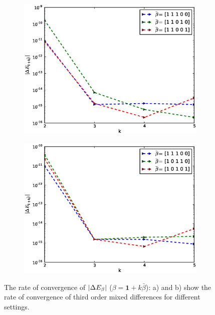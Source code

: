 \documentclass[11pt]{article}
\begin{document}
	\begin{figure}
	\centering
	\begin{subfigure}{.5\textwidth}
		\centering
		\includegraphics[width=1\linewidth]{./figures/mixed_difference_order3_basket_1.eps}
	    \caption{}
		\label{fig:sub5}
	\end{subfigure}%
	\begin{subfigure}{.5\textwidth}
		\centering
		\includegraphics[width=1\linewidth]{./figures/mixed_difference_order3_basket_2.eps}
		\caption{}
		\label{fig:sub6}
	\end{subfigure}
	
	\caption{The rate of convergence of $\left\lvert\Delta E_{\beta}\right\rvert$ ($\beta=\mathbf{1}+k \bar{\beta}$): a) and b) show  the rate of convergence of third order mixed differences for different settings.}
	\label{fig:test_basket_3}
\end{figure}
\end{document}
